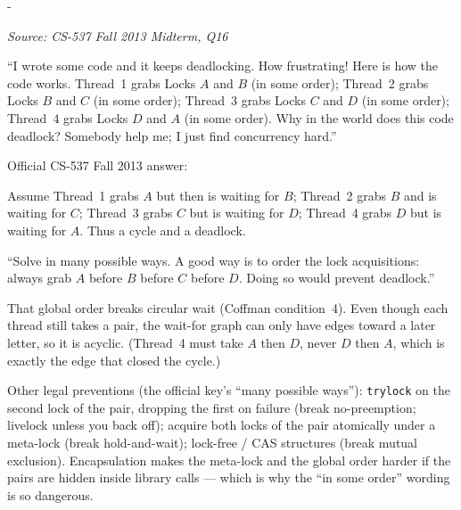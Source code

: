 \documentclass[11pt,a4paper]{article}
\makeatletter
\newcommand{\keepspace}[1]{\par\penalty-100\begingroup
  \setlength{\dimen@}{#1}\dimen@ii\pagegoal\advance\dimen@ii-\pagetotal
  \ifdim\dimen@>\dimen@ii\ifdim\dimen@ii>\z@\vfil\fi\break\fi\endgroup}
\newcounter{qn}[section]
\newenvironment{Qn}[4]{%
  \refstepcounter{qn}\keepspace{7\baselineskip}%
  \begin{tcolorbox}[qboxstyle, title={Q\thesection.\theqn\ \ [#1 \textbar\ #2]\ \ #4}]%
  {\footnotesize\color{g3}\textit{Source: #3}}\par\smallskip%
}{%
  \end{tcolorbox}%
}
\newenvironment{Sol}{%
  \begin{tcolorbox}[sboxstyle, title={Solution}]%
}{%
  \end{tcolorbox}\vspace{0.35em}%
}
\makeatother
\begin{document}
\begin{Qn}{Medium-Hard}{Lect 20}{CS-537 Fall 2013 Midterm, Q16}{Four threads, locks $A,B,C,D$ ``in some order''}
``I wrote some code and it keeps deadlocking. How frustrating! Here is how
the code works. Thread~1 grabs Locks $A$ and $B$ (in some order); Thread~2
grabs Locks $B$ and $C$ (in some order); Thread~3 grabs Locks $C$ and $D$
(in some order); Thread~4 grabs Locks $D$ and $A$ (in some order). Why in
the world does this code deadlock? Somebody help me; I just find
concurrency hard.''
\end{Qn}
\begin{Sol}
Official CS-537 Fall 2013 answer:

Assume Thread~1 grabs $A$ but then is waiting for $B$; Thread~2 grabs $B$
and is waiting for $C$; Thread~3 grabs $C$ but is waiting for $D$;
Thread~4 grabs $D$ but is waiting for $A$. Thus a cycle and a deadlock.

``Solve in many possible ways. A good way is to order the lock
acquisitions: always grab $A$ before $B$ before $C$ before $D$. Doing so
would prevent deadlock.''

That global order breaks circular wait (Coffman condition~4). Even though
each thread still takes a pair, the wait-for graph can only have edges
toward a later letter, so it is acyclic. (Thread~4 must take $A$ then
$D$, never $D$ then $A$, which is exactly the edge that closed the cycle.)

Other legal preventions (the official key's ``many possible ways''):
\texttt{trylock} on the second lock of the pair, dropping the first on
failure (break no-preemption; livelock unless you back off); acquire both
locks of the pair atomically under a meta-lock (break hold-and-wait);
lock-free / CAS structures (break mutual exclusion). Encapsulation makes
the meta-lock and the global order harder if the pairs are hidden inside
library calls --- which is why the ``in some order'' wording is so
dangerous.
\end{Sol}
\end{document}
